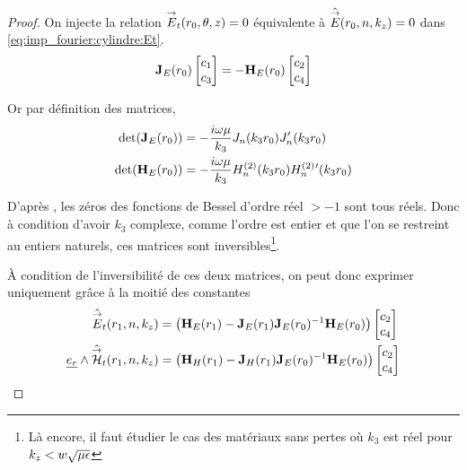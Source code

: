         \begin{proof}

            On injecte la relation \({\overset{\rightarrow}{E}}_t(r_0,\theta,z) = 0\) équivalente à \(\hat {{\overset{\rightarrow}{E}}}(r_0,n,k_z) = 0\) dans \eqref{eq:imp_fourier:cylindre:Et}.
            \begin{equation}
                \mathbf{J}_{E}(r_0)
                \begin{bmatrix}
                    c_1 \\
                    c_3
                \end{bmatrix}
                =-\mathbf{H}_{E}(r_0)
                \begin{bmatrix}
                    c_2 \\
                    c_4
                \end{bmatrix}
            \end{equation}

            Or par définition des matrices,
            \begin{align}
                \det(\mathbf{J}_E(r_0)) &= -\dfrac{i\omega\mu}{k_3}J_n(k_3r_0)J_n'(k_3r_0)
                \\
                \det(\mathbf{H}_E(r_0)) &= -\dfrac{i\omega\mu}{k_3}H_n^{(2)}(k_3r_0)H_n^{(2)}{}'(k_3r_0)
            \end{align}

            D’après \cite[p.~370]{abramowitz_handbook_1964}, les zéros des fonctions de Bessel d'ordre réel \(>-1\) sont tous réels.
            Donc à condition d'avoir \(k_3\) complexe, comme l'ordre est entier et que l'on se restreint au entiers naturels, ces matrices sont inversibles\footnote{Là encore, il faut étudier le cas des matériaux sans pertes où \(k_3\) est réel pour \(k_z < w\sqrt{\mu\epsilon}\)}.
            
            À condition de l'inversibilité de ces deux matrices, on peut donc exprimer uniquement grâce à la moitié des constantes
            \begin{align}
                \hat {{\overset{\rightarrow}{E}}}_t(r_1,n,k_z) &= 
                \left(\mathbf{H}_{E}(r_1) - \mathbf{J}_{E}(r_1)\mathbf{J}_{E}(r_0)^{-1}\mathbf{H}_{E}(r_0)\right)
                \begin{bmatrix}
                    c_2 \\
                    c_4
                \end{bmatrix}
                \\
                \underline{e_r}\wedge \hat {{\overset{\rightarrow}{\mathcal{H}}}}_t(r_1,n,k_z) &= 
                \left(\mathbf{H}_{H}(r_1) - \mathbf{J}_{H}(r_1)\mathbf{J}_{E}(r_0)^{-1}\mathbf{H}_{E}(r_0) \right)
                \begin{bmatrix}
                    c_2 \\
                    c_4
                \end{bmatrix}
            \end{align}


\end{proof}
